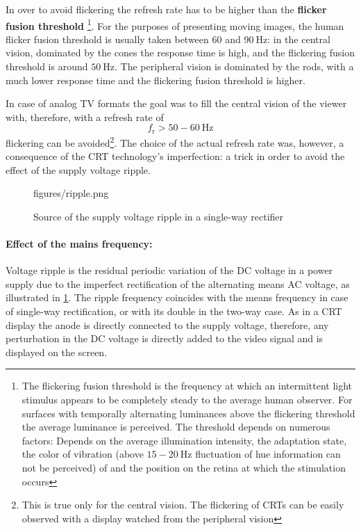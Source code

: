 In over to avoid flickering the refresh rate has to be higher than the \textbf{flicker fusion threshold}
\footnote{
The flickering fusion threshold is the frequency at which an intermittent light stimulus appears to be completely steady to the average human observer.
For surfaces with temporally alternating luminances above the flickering threshold the average luminance is perceived.
The threshold depends on numerous factors:
Depends on the average illumination intensity, the adaptation state, the color of vibration (above $15-20~\mathrm{Hz}$ fluctuation of hue information can not be perceived) of and the position on the retina at which the stimulation occurs}.
For the purposes of presenting moving images, the human flicker fusion threshold is usually taken between 60 and $90~\mathrm{Hz}$:
in the central vision, dominated by the cones the response time is high, and the flickering fusion threshold is around $50~\mathrm{Hz}$.
The peripheral vision is dominated by the rods, with a much lower response time and the flickering fusion threshold is higher.

In case of analog TV formats the goal was to fill the central vision of the viewer with, therefore, with a refresh rate of
\begin{equation}
f_{\mathrm{r}} > 50-60~\mathrm{Hz} 
\end{equation}
flickering can be avoided\footnote{This is true only for the central vision.
The flickering of CRTs can be easily observed with a display watched from the peripheral vision}.
The choice of the actual refresh rate was, however, a consequence of the CRT technology's imperfection: a trick in order to avoid the effect of the supply voltage ripple.

\begin{figure}[]
	\centering
	\begin{overpic}[width = 1\columnwidth ]{figures/ripple.png}
	\end{overpic}
	\caption{Source of the supply voltage ripple in a single-way rectifier}
	\label{Fig:ripple}
\end{figure}

\paragraph*{Effect of the mains frequency:}
Voltage ripple is the residual periodic variation of the DC voltage in a power supply due to the imperfect rectification of the alternating means AC voltage, as illustrated in \ref{Fig:ripple}.
The ripple frequency coincides with the means frequency in case of single-way rectification, or with its double in the two-way case.
As in a CRT display the anode is directly connected to the supply voltage, therefore, any perturbation in the DC voltage is directly added to the video signal and is displayed on the screen.

